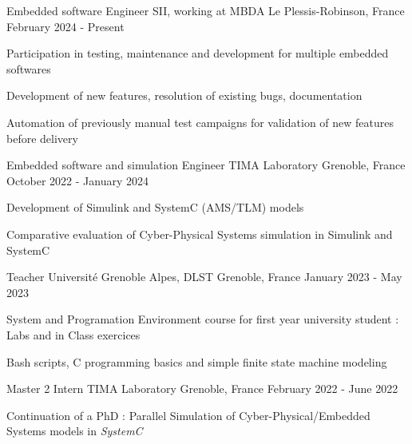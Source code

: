 

\begin{cventries}

	\cventry
	{Embedded software Engineer} %
	{SII, working at MBDA} %
	{Le Plessis-Robinson, France} %
	{February 2024 - Present} %
	{
		\begin{cvitems} %
		\item{Participation in testing, maintenance and development for multiple embedded softwares}
		\item{Development of new features, resolution of existing bugs, documentation}
		\item{Automation of previously manual test campaigns for validation of new features before delivery}
		\end{cvitems}
	}

	\cventry
	{Embedded software and simulation Engineer} %
	{TIMA Laboratory} %
	{Grenoble, France} %
	{October 2022 - January 2024} %
	{
		\begin{cvitems} %
		\item{Development of Simulink and SystemC (AMS/TLM) models}
		\item{Comparative evaluation of Cyber-Physical Systems simulation in Simulink and SystemC}
		\end{cvitems}
	}

	\cventry
	{Teacher} %
	{Université Grenoble Alpes, DLST} %
	{Grenoble, France} %
	{January 2023 - May 2023} %
	{
		\begin{cvitems} %
		\item{System and Programation Environment course for first year university student : Labs and in Class exercices}
		\item{Bash scripts, C programming basics and simple finite state machine modeling}
		\end{cvitems}
	}

	\cventry
	{Master 2 Intern} %
	{TIMA Laboratory} %
	{Grenoble, France} %
	{February 2022 - June 2022} %
	{
		\begin{cvitems} %
		\item{Continuation of a PhD : Parallel Simulation of Cyber-Physical/Embedded Systems models in \emph{SystemC}}
		\end{cvitems}
	}


\end{cventries}
